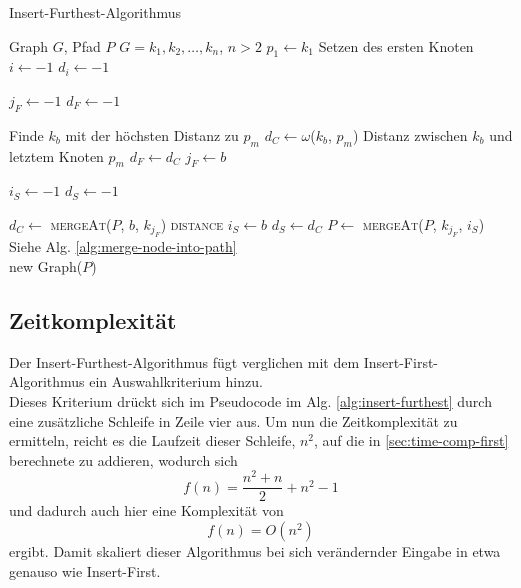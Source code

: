 \begin{algorithm}[H]
    \caption{Insert-Furthest-Algorithmus}
    \label{alg:insert-furthest}
    \begin{algorithmic}[1]
        \Require Graph $G$, Pfad $P$ 
        \Require $G= k_1,k_2,\ldots,k_n$, $n > 2$ 
        \State $p_1 \gets k_1$
        \Comment Setzen des ersten Knoten
        \State $i \gets -1$
        \State $d_i \gets -1$

            \State $j_F \gets -1$
            \State $d_F \gets -1$

                \Comment Finde $k_b$ mit der höchsten Distanz zu $p_m$
                \State $d_C \gets \omega$($k_b$, $p_m$)
                \Comment Distanz zwischen $k_b$ und letztem Knoten $p_m$
                    \State $d_F \gets d_C$
                    \State $j_F \gets b$
                \EndIf
            \EndFor

            \State $i_S \gets -1$
            \State $d_S \gets -1$

                \State $d_C \gets$ \textsc{mergeAt}($P$, $b$, $k_{j_F}$) \textsc{distance}
                    \State $i_S \gets b$
                    \State $d_S \gets d_C$
                \EndIf
            \EndFor
            \State $P \gets$ \textsc{mergeAt}($P$, $k_{j_F}$, $i_S$)
            \Comment Siehe Alg. \vref{alg:merge-node-into-path}
        \EndFor \\
        \Return new Graph($P$)
    \end{algorithmic}
\end{algorithm}

\subsection{Zeitkomplexität}
Der Insert-Furthest-Algorithmus fügt verglichen mit dem Insert-First-Algorithmus ein Auswahlkriterium hinzu.\\
Dieses Kriterium drückt sich im Pseudocode im \ac{Alg.} \vref{alg:insert-furthest} durch eine zusätzliche Schleife in Zeile vier aus.
Um nun die Zeitkomplexität zu ermitteln, reicht es die Laufzeit dieser Schleife, $n^2$, auf die in \vref{sec:time-comp-first} berechnete zu addieren, wodurch sich 
$$f(n) = \frac{n^2+n}{2}+n^2 -1$$
und dadurch auch hier eine Komplexität von
$$f(n) = O(n^2)$$
ergibt.
Damit skaliert dieser Algorithmus bei sich verändernder Eingabe in etwa genauso wie Insert-First.

